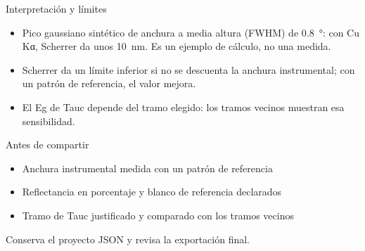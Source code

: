 \documentclass[aspectratio=169,11pt]{beamer}
\begin{document}
\begin{frame}{Interpretación y límites}
  \transdissolve[duration=0.25]
  \begin{itemize}
    \item Pico gaussiano sintético de anchura a media altura (FWHM) de \SI{0.8}{\degree}: con Cu Kα, Scherrer da unos \SI{10}{\nano\meter}. Es un ejemplo de cálculo, no una medida.
    \item Scherrer da un límite inferior si no se descuenta la anchura instrumental; con un patrón de referencia, el valor mejora.
    \item El Eg de Tauc depende del tramo elegido: los tramos vecinos muestran esa sensibilidad.
  \end{itemize}
\end{frame}

\begin{frame}{Antes de compartir}
  \transdissolve[duration=0.25]
  \begin{itemize}
    \item Anchura instrumental medida con un patrón de referencia
    \item Reflectancia en porcentaje y blanco de referencia declarados
    \item Tramo de Tauc justificado y comparado con los tramos vecinos
  \end{itemize}
  \medskip

  {\small Conserva el proyecto JSON y revisa la exportación final.}
\end{frame}
\end{document}
